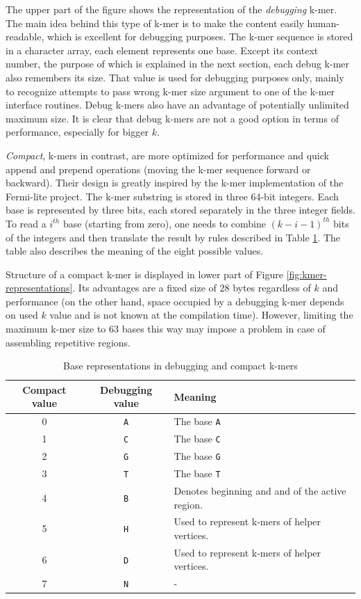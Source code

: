 The upper part of the figure shows the representation of the \textit{debugging} k-mer. The main idea behind this type of k-mer is to make the content easily human-readable, which is excellent for debugging purposes. The k-mer sequence is stored in a character array, each element represents one base. Except its context number, the purpose of which is explained in the next section, each debug k-mer also remembers its size. That value is used for debugging purposes only, mainly to recognize attempts to pass wrong k-mer size argument to one of the k-mer interface routines. Debug k-mers also have an advantage of potentially unlimited maximum size. It is clear that debug k-mers are not a good option in terms of performance, especially for bigger $k$.

\textit{Compact}, k-mers in contrast,  are more optimized for performance and quick append and prepend operations (moving the k-mer sequence forward or backward). Their design is greatly inspired by the k-mer implementation of the Fermi-lite project. The k-mer substring is stored in three 64-bit integers. Each base is represented by three bits, each stored separately in  the three integer fields. To read a $i^{th}$ base (starting from zero), one needs to combine $(k-i-1)^{th}$ bits of the integers and then translate the result by rules described in Table \ref{tab:base-translation}. The table also describes the meaning of the eight possible values.

Structure of a compact k-mer is displayed in lower part of Figure \ref{fig:kmer-representations}. Its advantages are a fixed size of 28 bytes regardless of $k$ and performance (on the other hand, space occupied by a debugging k-mer depends on used $k$ value and is not known at the compilation time). However, limiting the maximum k-mer size to 63 bases this way may impose a problem in case of assembling repetitive regions.

\begin{table}[h]
\begin{center}
\caption{Base representations in debugging and compact k-mers}
\label{tab:base-translation}
\begin{tabular}{| c | c | p{5cm} |}
\hline
Compact value & Debugging value & Meaning \\
\hline
0 & \texttt{A} & The base \texttt{A} \\
\hline
1 & \texttt{C} & The base \texttt{C} \\
\hline
2 & \texttt{G} & The base \texttt{G} \\
\hline
3 & \texttt{T} & The base \texttt{T} \\
\hline
4 & \texttt{B} & Denotes beginning and and of the active region. \\
\hline
5 & \texttt{H} & Used to represent k-mers of helper vertices. \\
\hline
6 & \texttt{D} & Used to represent k-mers of helper vertices. \\
\hline
7 & \texttt{N} & - \\
\hline
\end{tabular}
\end{center}
\end{table}

